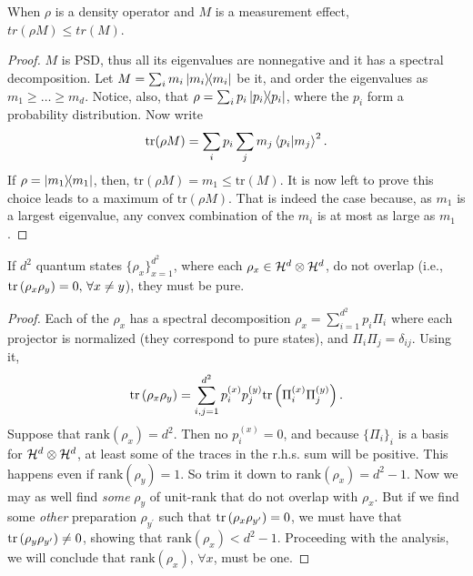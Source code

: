     \begin{lemma}
        When $\rho$ is a density operator and $M$ is a measurement effect, $tr(\rho M) \leq tr(M)$.
        \label{lem:outcome-upper-bound}
    \end{lemma}
    \begin{proof}
        $M$ is PSD, thus all its eigenvalues are nonnegative and it has a spectral decomposition. Let $M = \sum_i m_i \ketbra{m_i}{m_i}$ be it, and order the eigenvalues as $m_1 \geq \ldots \geq m_d$. Notice, also, that $\rho = \sum_i p_i \ketbra{p_i}{p_i}$, where the $p_i$ form a probability distribution. Now write 
        $$
            \text{tr}(\rho M) = \sum_{i} p_i \sum_j m_j \braket{p_i}{m_j}^2 .
        $$
        If $\rho = \ketbra{m_1}{m_1}$, then, $\text{tr}(\rho M) = m_1 \leq\text{tr}(M)$. It is now left to prove this choice leads to a maximum of $\text{tr}(\rho M)$. That is indeed the case because, as $m_1$ is a largest eigenvalue, any convex combination of the $m_i$ is at most as large as $m_1$.
    \end{proof}

    \begin{lemma}
        If $d^2$ quantum states $\{ \rho_x \}_{x=1}^{d^2}$, where each $\rho_x \in \mathcal{H}^{d} \otimes \mathcal{H}^{d}$, do not overlap (i.e., $\text{tr}\left( \rho_x \rho_y \right) = 0, \,\forall x \neq y$), they must be pure.
        \label{lem:overlap}
    \end{lemma}
    \begin{proof}
        Each of the $\rho_x$ has a spectral decomposition $\rho_x = \sum_{i = 1}^{d^2} p_i \Pi_i$ where each projector is normalized (they correspond to pure states), and $\Pi_i \Pi_j = \delta_{ij}$. Using it,
        $$
            \text{tr}\left( \rho_x \rho_y \right) = \sum_{i,j=1}^{d^2} p_i^{(x)} p_j^{(y)} \text{tr}\left( \Pi_i^{(x)} \Pi_j^{(y)} \right) .
        $$
        Suppose that $\text{rank}(\rho_x) = d^2$. Then no $p_i^{(x)} = 0$, and because $\{ \Pi_i \}_i$ is a basis for $\mathcal{H}^{d} \otimes \mathcal{H}^{d}$, at least some of the traces in the r.h.s. sum will be positive. This happens even if $\text{rank}(\rho_y) = 1$. So trim it down to $\text{rank}(\rho_x) = d^2 - 1$. Now we may as well find \emph{some} $\rho_y$ of unit-rank that do not overlap with $\rho_x$. But if we find some \emph{other} preparation $\rho_{y^\prime}$ such that $\text{tr}\left( \rho_x \rho_{y^\prime} \right) = 0$, we must have that $\text{tr}\left( \rho_y \rho_{y^\prime} \right) \neq 0$, showing that $\text{rank}(\rho_x) < d^2 - 1$. Proceeding with the analysis, we will conclude that $\text{rank}(\rho_x), \,\forall x$, must be one.
    \end{proof}


